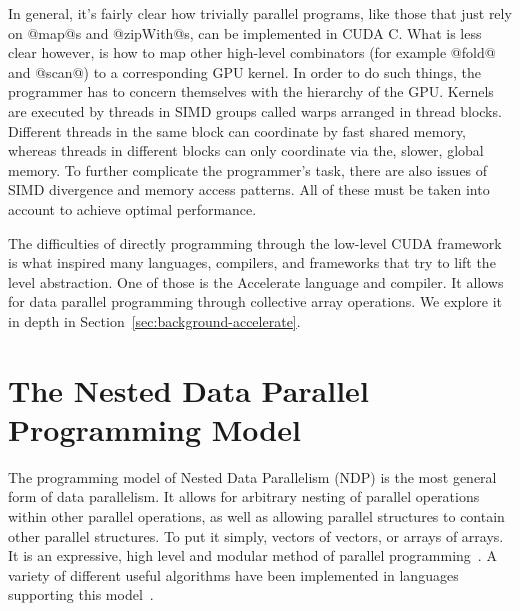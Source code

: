In general, it's fairly clear how trivially parallel programs, like those that just rely on @map@s and @zipWith@s, can be implemented in CUDA C. What is less clear however, is how to map other high-level combinators (for example @fold@ and @scan@) to a corresponding GPU kernel. In order to do such things, the programmer has to concern themselves with the hierarchy of the GPU. Kernels are executed by threads in SIMD groups called warps arranged in thread blocks. Different threads in the same block can coordinate by fast shared memory, whereas threads in different blocks can only coordinate via the, slower, global memory. To further complicate the programmer's task, there are also issues of SIMD divergence and memory access patterns. All of these must be taken into account to achieve optimal performance.


The difficulties of directly programming through the low-level CUDA framework is what inspired many languages, compilers, and frameworks that try to lift the level abstraction. One of those is the Accelerate language and compiler. It allows for data parallel programming through collective array operations. We explore it in depth in Section~\ref{sec:background-accelerate}.

\section{The Nested Data Parallel Programming Model}
\label{sec:ndp}

The programming model of Nested Data Parallelism (NDP) is the most general form of data parallelism. It allows for arbitrary nesting of parallel operations within other parallel operations, as well as allowing parallel structures to contain other parallel structures. To put it simply, vectors of vectors, or arrays of arrays. It is an expressive, high level and modular method of parallel programming~\cite{Blelloch:1990vl}. A variety of different useful algorithms have been implemented in languages supporting this model~\cite{Blelloch:nbody94,Blelloch:delaunay96,Blelloch:connected94}.

